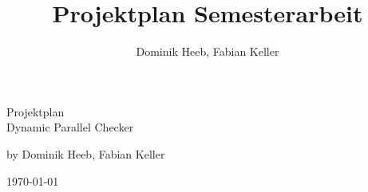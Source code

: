 \documentclass[10pt,a4paper]{article}
\author{Dominik Heeb, Fabian Keller}
\title{Projektplan Semesterarbeit}
\begin{document}
\begin{titlepage}
	\begin{Huge}
		\begin{center}
				Projektplan \\Dynamic Parallel Checker\\[3.0cm]
		\end{center}
	\end{Huge}
	
	\begin{Large}
		\begin{center}
				by Dominik Heeb, Fabian Keller		
		\end{center}
	\end{Large}
	\vfill
	\today
\end{titlepage}
\end{document}
